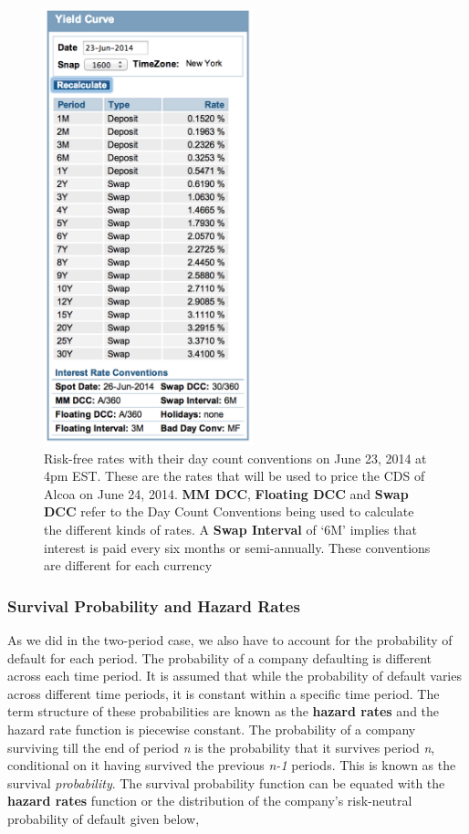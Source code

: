 \documentclass[article]{jss}
\begin{document}
\begin{figure}[H]
\centering
\includegraphics[width=2.4in, height=5in]{images/YieldCurve.png}
\caption{Risk-free rates with their day count conventions on June 23, 2014 at 4pm EST. These are the rates that will be used to price the CDS of Alcoa on June 24, 2014. \textbf{MM DCC}, \textbf{Floating DCC} and \textbf{Swap DCC} refer to the Day Count Conventions being used to calculate the different kinds of rates. A \textbf{Swap Interval} of `6M' implies that interest is paid every six months or semi-annually. These conventions are different for each currency}
\label{fig:AlcoaRates}
\end{figure} 

\subsubsection{Survival Probability and Hazard Rates}

As we did in the two-period case, we also have to account for the probability of default for each period. The probability of a company defaulting is different across each time period. It is assumed that while the probability of default varies across different time periods, it is constant within a specific time period. The term structure of these probabilities are known as the \textbf{hazard rates} and the hazard rate function is piecewise constant.  
The probability of a company surviving till the end of period \textit{n} is the probability that it survives period \textit{n}, conditional on it having survived the previous \textit{n-1} periods. This is known as the survival \textit{probability}. The survival probability function can be equated with the \textbf{hazard rates} function or the distribution of the company's risk-neutral probability of default given below,
\end{document}
